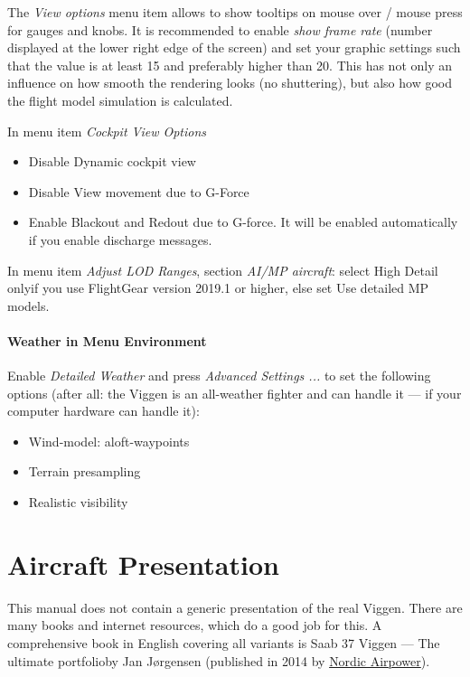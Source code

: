 The \emph{View options} menu item allows to show tooltips on mouse over / mouse press for gauges and knobs. It is recommended to enable \emph{show frame rate} (number displayed at the lower right edge of the screen) and set your graphic settings such that the value is at least 15 and preferably higher than 20. This has not only an influence on how smooth the rendering looks (no shuttering), but also how good the flight model simulation is calculated.

In menu item \emph{Cockpit View Options}
\begin{itemize}
\item Disable \glqq Dynamic cockpit view \grqq
\item Disable \glqq View movement due to G-Force\grqq
\item Enable \glqq Blackout and Redout due to G-force\grqq. It will be enabled automatically if you enable discharge messages.
\end{itemize}

In menu item \emph{Adjust LOD Ranges}, section \emph{AI/MP aircraft}: select \glqq High Detail only\grqq if you use FlightGear version 2019.1 or higher, else set \glqq Use detailed MP models\grqq.

\subsection{Weather in Menu Environment}
Enable \emph{Detailed Weather} and press \emph{Advanced Settings ...} to set the following options (after all: the Viggen is an all-weather fighter and can handle it --- if your computer hardware can handle it):
\begin{itemize}
\item Wind-model: aloft-waypoints
\item Terrain presampling
\item Realistic visibility
\end{itemize}

\part{Aircraft Presentation}
This manual does not contain a generic presentation of the real Viggen. There are many books and internet resources, which do a good job for this. A comprehensive book in English covering all variants is \glqq Saab 37 Viggen --- The ultimate portfolio\grqq by Jan Jørgensen (published in 2014 by \href{http://www.nordicairpower.com/}{Nordic Airpower}).

